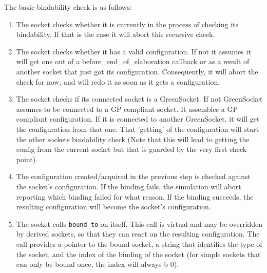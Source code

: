 \documentclass[a4paper,10pt]{article}          %
\begin{document}


The basic bindability check is as follows:
\begin{enumerate}

\item
The socket checks whether it is currently in the process of checking its bindability. If that is the case it will abort this recursive check.

\item
The socket checks whether it has a valid configuration. If not it assumes it will get one out of a before\_end\_of\_elaboration callback or as a result of another socket that just got its configuration.
Consequently, it will abort the check for now, and will redo it as soon as it gets a configuration.

\item
The socket checks if its connected socket is a GreenSocket. If not GreenSocket assumes to be connected to a GP compliant socket. It assembles a GP compliant configuration. If it is connected to another GreenSocket, it will get the configuration from that one. That 'getting' of the configuration will start the other sockets bindability check (Note that this will lead to getting the config from the current socket but that is guarded by the very first check point).

\item
The configuration created/acquired in the previous step is checked against the socket's configuration. If the binding fails, the simulation will abort reporting which binding failed for what reason. If the binding succeeds, the resulting configuration will become the socket's configuration.

\item
The socket calls \verb|bound_to| on itself. This call is virtual and may be overridden by derived sockets, so that they can react on the resulting configuration. The call provides a pointer to the bound socket, a string that identifies the type of the socket, and the index of the binding of the socket (for simple sockets that can only be bound once, the index will always b 0).

\end{enumerate}

\vspace{4mm}
\end{document}
